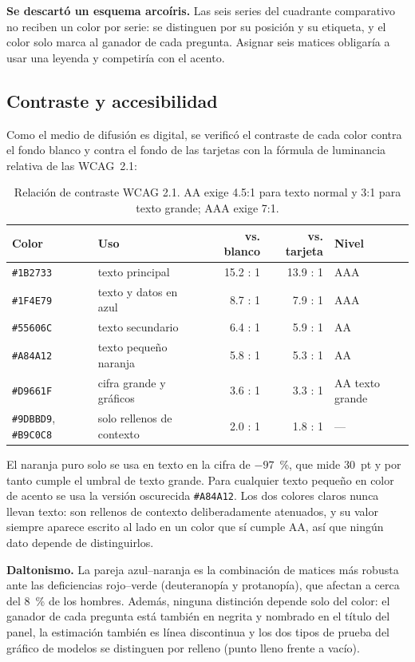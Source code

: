 \documentclass[12pt,letterpaper]{article}
\begin{document}
\textbf{Se descartó un esquema arcoíris.} Las seis series del cuadrante comparativo no reciben un
color por serie: se distinguen por su posición y su etiqueta, y el color solo marca al ganador de
cada pregunta. Asignar seis matices obligaría a usar una leyenda y competiría con el acento.

\subsection{Contraste y accesibilidad}

Como el medio de difusión es digital, se verificó el contraste de cada color contra el fondo
blanco y contra el fondo de las tarjetas con la fórmula de luminancia relativa de las WCAG~2.1:

\begin{table}[H]
\centering
\small
\begin{tabular}{llrrl}
\toprule
\textbf{Color} & \textbf{Uso} & \textbf{vs. blanco} & \textbf{vs. tarjeta} & \textbf{Nivel} \\
\midrule
\texttt{\#1B2733} & texto principal & 15.2 : 1 & 13.9 : 1 & AAA \\
\texttt{\#1F4E79} & texto y datos en azul & 8.7 : 1 & 7.9 : 1 & AAA \\
\texttt{\#55606C} & texto secundario & 6.4 : 1 & 5.9 : 1 & AA \\
\texttt{\#A84A12} & texto pequeño naranja & 5.8 : 1 & 5.3 : 1 & AA \\
\texttt{\#D9661F} & cifra grande y gráficos & 3.6 : 1 & 3.3 : 1 & AA texto grande \\
\texttt{\#9DBBD9}, \texttt{\#B9C0C8} & solo rellenos de contexto & 2.0 : 1 & 1.8 : 1 & --- \\
\bottomrule
\end{tabular}
\caption{Relación de contraste WCAG 2.1. AA exige 4.5:1 para texto normal y 3:1 para texto
grande; AAA exige 7:1.}
\end{table}

El naranja puro solo se usa en texto en la cifra de $-97$~\%, que mide 30~pt y por tanto cumple
el umbral de texto grande. Para cualquier texto pequeño en color de acento se usa la versión
oscurecida \texttt{\#A84A12}. Los dos colores claros nunca llevan texto: son rellenos de
contexto deliberadamente atenuados, y su valor siempre aparece escrito al lado en un color que sí
cumple AA, así que ningún dato depende de distinguirlos.

\textbf{Daltonismo.} La pareja azul--naranja es la combinación de matices más robusta ante las
deficiencias rojo--verde (deuteranopía y protanopía), que afectan a cerca del 8~\% de los
hombres. Además, ninguna distinción depende solo del color: el ganador de cada pregunta está
también en negrita y nombrado en el título del panel, la estimación también es línea discontinua
y los dos tipos de prueba del gráfico de modelos se distinguen por relleno (punto lleno frente a
vacío).
\end{document}
